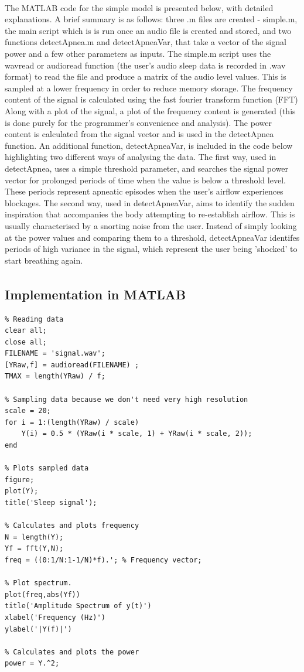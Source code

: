 The MATLAB\textsuperscript{\textregistered{}} code for the simple model is presented below, with detailed explanations. A brief summary is as follows: three .m files are created - simple.m, the main script which is is run once an audio file is created and stored, and  two functions detectApnea.m and detectApneaVar, that take a vector of the signal power and a few other parameters as inputs. The simple.m script uses the wavread or audioread function (the user's audio sleep data is recorded in .wav format) to read the file and produce a matrix of the audio level values. This is sampled at a lower frequency in order to reduce memory storage. The frequency content of the signal is calculated using the fast fourier transform function (FFT) Along with a plot of the signal, a plot of the frequency content is generated (this is done purely for the programmer's convenience and analysis). The power content is calculated from the signal vector and is used in the detectApnea function. An additional function, detectApneaVar, is included in the code below highlighting two different ways of analysing the data. The first way, used in detectApnea, uses a simple threshold parameter, and searches the signal power vector for prolonged periods of time when the value is below a threshold level. These periods represent apneatic episodes when the user's airflow experiences blockages. The second way, used in detectApneaVar, aims to identify the sudden inspiration that accompanies the body attempting to re-establish airflow. This is usually characterised by a snorting noise from the user. Instead of simply looking at the power values and comparing them to a threshold, detectApneaVar identifes periods of high variance in the signal, which represent the user being 'shocked' to start breathing again.

\subsection{Implementation in MATLAB\textsuperscript{\textregistered{}}}

\begin{lstlisting} 
% Reading data
clear all;
close all;
FILENAME = 'signal.wav';
[YRaw,f] = audioread(FILENAME) ;
TMAX = length(YRaw) / f;

% Sampling data because we don't need very high resolution
scale = 20;
for i = 1:(length(YRaw) / scale)
    Y(i) = 0.5 * (YRaw(i * scale, 1) + YRaw(i * scale, 2));
end

% Plots sampled data
figure;
plot(Y);
title('Sleep signal');

% Calculates and plots frequency
N = length(Y);
Yf = fft(Y,N);
freq = ((0:1/N:1-1/N)*f).'; % Frequency vector;

% Plot spectrum.
plot(freq,abs(Yf)) 
title('Amplitude Spectrum of y(t)')
xlabel('Frequency (Hz)')
ylabel('|Y(f)|')

% Calculates and plots the power
power = Y.^2;
\end{lstlisting}

